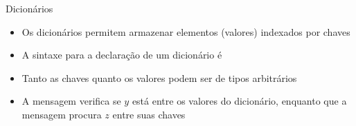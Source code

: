 \begin{frame}[fragile]{Dicionários}

    \begin{itemize}
        \item Os dicionários permitem armazenar elementos (valores) indexados por
            chaves

        \item A sintaxe para a declaração de um dicionário é


        \item Tanto as chaves quanto os valores podem ser de tipos arbitrários


        \item A mensagem  verifica se $y$ está entre os
            valores do dicionário, enquanto que a mensagem 
            procura $z$ entre suas chaves

    \end{itemize}

\end{frame}

